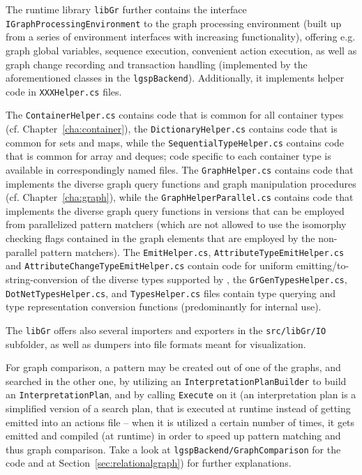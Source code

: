 The runtime library \texttt{libGr} further contains the interface \texttt{IGraph\-Processing\-Environment} to the graph processing environment (built up from a series of environment interfaces with increasing functionality), offering e.g. graph global variables, sequence execution, convenient action execution, as well as graph change recording and transaction handling (implemented by the aforementioned classes in the \texttt{lgsp\-Backend}).
Additionally, it implements helper code in \texttt{XXXHelper.cs} files.

The \texttt{Container\-Helper.cs} contains code that is common for all container types (cf. Chapter~\ref{cha:container}), the \texttt{Dictionary\-Helper.cs} contains code that is common for sets and maps, while the \texttt{Sequential\-Type\-Helper.cs} contains code that is common for array and deques; code specific to each container type is available in correspondingly named files.
The \texttt{Graph\-Helper.cs} contains code that implements the diverse graph query functions and graph manipulation procedures (cf. Chapter~\ref{cha:graph}), while the \texttt{Graph\-Helper\-Parallel.cs} contains code that implements the diverse graph query functions in versions that can be employed from parallelized pattern matchers (which are not allowed to use the isomorphy checking flags contained in the graph elements that are employed by the non-parallel pattern matchers).
The \texttt{Emit\-Helper.cs}, \texttt{Attribute\-Type\-Emit\-Helper.cs} and \texttt{Attribute\-Change\-Type\-Emit\-Helper.cs} contain code for uniform emitting/to-string-conversion of the diverse types supported by \GrG, the \texttt{GrGen\-Types\-Helper.cs}, \texttt{Dot\-Net\-Types\-Helper.cs}, and \texttt{Types\-Helper.cs} files contain type querying and type representation conversion functions (predominantly for internal use).

The \texttt{libGr} offers also several importers and exporters in the \texttt{src/libGr/IO} subfolder, as well as dumpers into file formats meant for visualization.

For graph comparison, a pattern may be created out of one of the graphs, and searched in the other one, by utilizing an \texttt{Interpretation\-Plan\-Builder} to build an \texttt{Interpretation\-Plan}, and by calling \texttt{Execute} on it (an interpretation plan is a simplified version of a search plan, that is executed at runtime instead of getting emitted into an actions file -- when it is utilized a certain number of times, it gets emitted and compiled (at runtime) in order to speed up pattern matching and thus graph comparison.
Take a look at \texttt{lgspBackend/Graph\-Comparison} for the code and at Section~\ref{sec:relationalgraph}) for further explanations.

